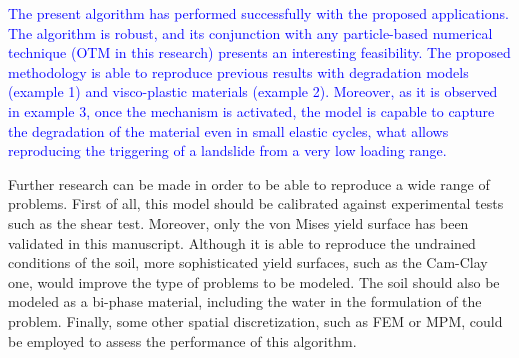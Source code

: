 \documentclass[applsci,journal,article,submit,moreauthors,pdftex]{Definitions/mdpi}
\begin{document}
\textcolor{blue}{The present algorithm has performed successfully with the proposed applications. The algorithm is robust, and its conjunction with any particle-based numerical technique (OTM in this research) presents an interesting feasibility. The proposed methodology is able to reproduce previous results with degradation models (example 1) and visco-plastic materials (example 2). Moreover, as it is observed in example 3, once the mechanism is activated, the model is capable to capture the degradation of the material even in small elastic cycles, what allows reproducing the triggering of a landslide from a very low loading range.}

Further research can be made in order to be able to reproduce a wide range of problems. First of all, this model should be calibrated against experimental tests such as the shear test. Moreover, only the von Mises yield surface has been validated in this manuscript. Although it is able to reproduce the undrained conditions of the soil, more sophisticated yield surfaces, such as the Cam-Clay one, would improve the type of problems to be modeled. The soil should also be modeled as a bi-phase material, including the water in the formulation of the problem. Finally, some other spatial discretization, such as FEM or MPM, could be employed to assess the performance of this algorithm.

\vspace{6pt} 






\end{document}
